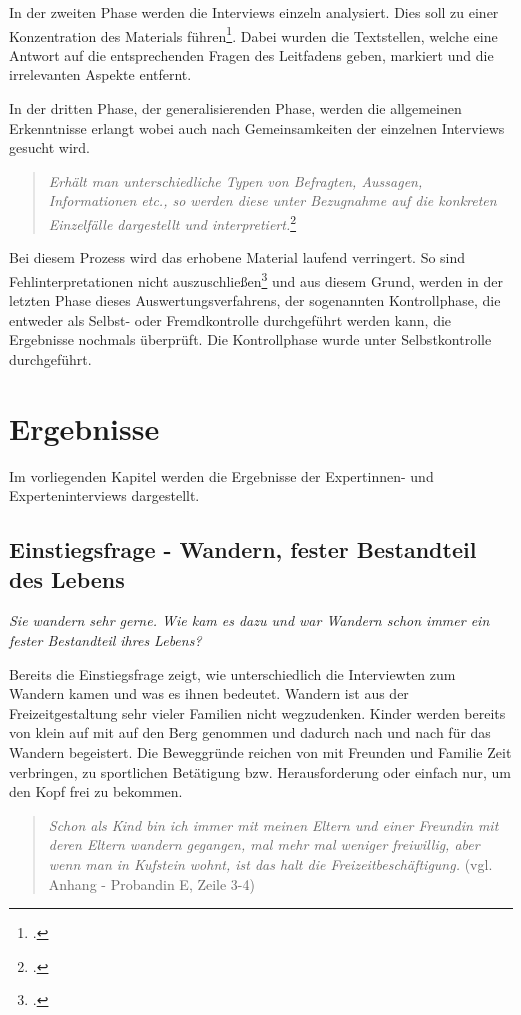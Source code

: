 In der zweiten Phase werden die Interviews einzeln analysiert. Dies soll zu einer Konzentration des Materials führen\footcite[S.368]{lamnek}. Dabei wurden die Textstellen, welche eine Antwort auf die entsprechenden Fragen des Leitfadens geben, markiert und die irrelevanten Aspekte entfernt.

In der dritten Phase, der generalisierenden Phase, werden die allgemeinen Erkenntnisse erlangt wobei auch nach Gemeinsamkeiten der einzelnen Interviews gesucht wird. 

\begin{quote}
	\textit{\glqq Erhält man unterschiedliche Typen von Befragten, Aussagen, Informationen etc., so werden diese unter Bezugnahme auf die konkreten Einzelfälle dargestellt und interpretiert.\grqq}\footcite[S. 369]{lamnek}
\end{quote}

Bei diesem Prozess wird das erhobene Material laufend verringert. So sind Fehlinterpretationen nicht auszuschließen\footcite[S. 369]{lamnek} und aus diesem Grund, werden in der letzten Phase dieses Auswertungsverfahrens, der sogenannten Kontrollphase, die entweder als Selbst- oder Fremdkontrolle durchgeführt werden kann, die Ergebnisse nochmals überprüft. Die Kontrollphase wurde unter Selbstkontrolle durchgeführt.


\section{Ergebnisse}

Im vorliegenden Kapitel werden die Ergebnisse der Expertinnen- und Experteninterviews dargestellt. 

\subsection{Einstiegsfrage - Wandern, fester Bestandteil des Lebens}

\textit{Sie wandern sehr gerne. Wie kam es dazu und war Wandern schon immer ein fester Bestandteil ihres Lebens?}

Bereits die Einstiegsfrage zeigt, wie unterschiedlich die Interviewten zum Wandern kamen und was es ihnen bedeutet.
Wandern ist aus der Freizeitgestaltung sehr vieler Familien nicht wegzudenken. Kinder werden bereits von klein auf mit auf den Berg genommen und dadurch nach und nach für das Wandern begeistert. Die Beweggründe reichen von mit Freunden und Familie Zeit verbringen, zu sportlichen Betätigung bzw. Herausforderung oder einfach nur, um den Kopf frei zu bekommen. 
\begin{quote}
	\textit{\glqq Schon als Kind bin ich immer mit meinen Eltern und einer Freundin mit deren Eltern wandern gegangen, mal mehr mal weniger freiwillig, aber wenn man in Kufstein wohnt, ist das halt die Freizeitbeschäftigung.\grqq} (vgl. Anhang - Probandin E, Zeile 3-4)
\end{quote}

